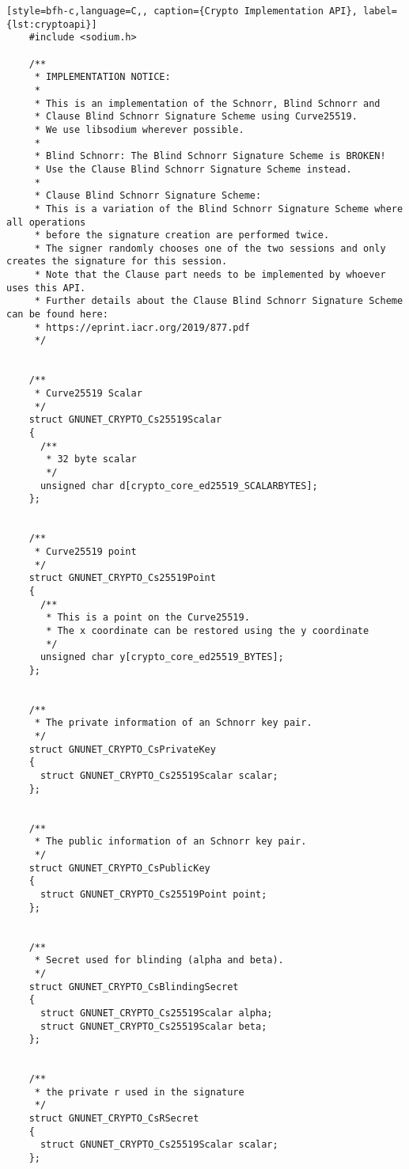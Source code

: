 \begin{lstlisting}[style=bfh-c,language=C,, caption={Crypto Implementation API}, label={lst:cryptoapi}]
    #include <sodium.h>
    
    /**
     * IMPLEMENTATION NOTICE:
     * 
     * This is an implementation of the Schnorr, Blind Schnorr and 
     * Clause Blind Schnorr Signature Scheme using Curve25519.
     * We use libsodium wherever possible.
     * 
     * Blind Schnorr: The Blind Schnorr Signature Scheme is BROKEN!
     * Use the Clause Blind Schnorr Signature Scheme instead.
     * 
     * Clause Blind Schnorr Signature Scheme:
     * This is a variation of the Blind Schnorr Signature Scheme where all operations
     * before the signature creation are performed twice.
     * The signer randomly chooses one of the two sessions and only creates the signature for this session.
     * Note that the Clause part needs to be implemented by whoever uses this API.
     * Further details about the Clause Blind Schnorr Signature Scheme can be found here:
     * https://eprint.iacr.org/2019/877.pdf
     */
    
    
    /**
     * Curve25519 Scalar
     */
    struct GNUNET_CRYPTO_Cs25519Scalar
    {
      /**
       * 32 byte scalar
       */
      unsigned char d[crypto_core_ed25519_SCALARBYTES];
    };
    
    
    /**
     * Curve25519 point
     */
    struct GNUNET_CRYPTO_Cs25519Point
    {
      /**
       * This is a point on the Curve25519.
       * The x coordinate can be restored using the y coordinate
       */
      unsigned char y[crypto_core_ed25519_BYTES];
    };
    
    
    /**
     * The private information of an Schnorr key pair.
     */
    struct GNUNET_CRYPTO_CsPrivateKey
    {
      struct GNUNET_CRYPTO_Cs25519Scalar scalar;
    };
    
    
    /**
     * The public information of an Schnorr key pair.
     */
    struct GNUNET_CRYPTO_CsPublicKey
    {
      struct GNUNET_CRYPTO_Cs25519Point point;
    };
    
    
    /**
     * Secret used for blinding (alpha and beta).
     */
    struct GNUNET_CRYPTO_CsBlindingSecret
    {
      struct GNUNET_CRYPTO_Cs25519Scalar alpha;
      struct GNUNET_CRYPTO_Cs25519Scalar beta;
    };
    
    
    /**
     * the private r used in the signature
     */
    struct GNUNET_CRYPTO_CsRSecret
    {
      struct GNUNET_CRYPTO_Cs25519Scalar scalar;
    };
    

\end{lstlisting}
